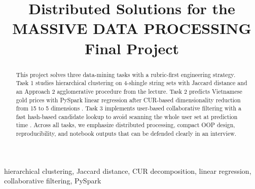 \documentclass[conference]{IEEEtran}
\begin{document}
\title{Distributed Solutions for the MASSIVE DATA PROCESSING Final Project}

\author{
\and
{}
\and
{}
\and
{}
}

\maketitle

\begin{abstract}
This project solves three data-mining tasks with a rubric-first engineering strategy. 
Task 1 studies hierarchical clustering on 4-shingle string sets with Jaccard distance \cite{jaccard1901} and an Approach 2 agglomerative procedure from the lecture. 
Task 2 predicts Vietnamese gold prices with PySpark linear regression after CUR-based dimensionality reduction from 15 to 5 dimensions \cite{drineas2006cur}. 
Task 3 implements user-based collaborative filtering with a fast hash-based candidate lookup to avoid scanning the whole user set at prediction time \cite{herlocker1999cf}. 
Across all tasks, we emphasize distributed processing, compact OOP design, reproducibility, and notebook outputs that can be defended clearly in an interview.
\end{abstract}

\begin{IEEEkeywords}
hierarchical clustering, Jaccard distance, CUR decomposition, linear regression, collaborative filtering, PySpark
\end{IEEEkeywords}
\end{document}
